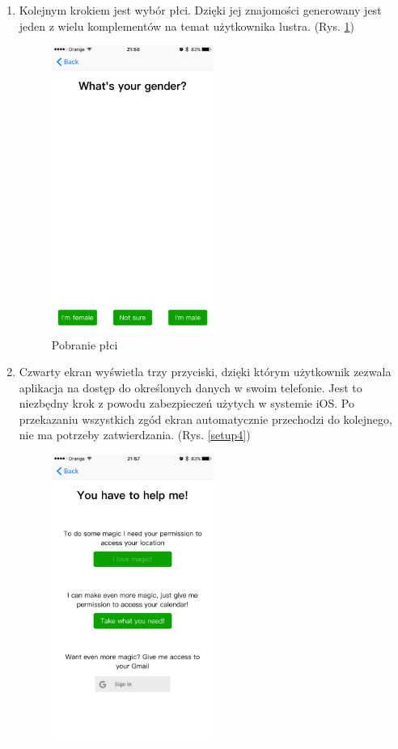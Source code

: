 \documentclass[a4paper,11pt]{article}
\begin{document}
\begin{enumerate}
	\newpage
	\item Kolejnym krokiem jest wybór płci. Dzięki jej znajomości generowany jest jeden z wielu komplementów na temat użytkownika lustra. (Rys. \ref{setup3})
	\begin{figure}[H]
	\includegraphics[width=0.5\textwidth,center]{ios-screens/setup3.png}
	\caption {Pobranie płci}
	\label{setup3}
	\end{figure}
\newpage
\item Czwarty ekran wyświetla trzy przyciski, dzięki którym użytkownik zezwala aplikacja na dostęp do określonych danych w swoim telefonie. Jest to niezbędny krok z powodu zabezpieczeń użytych w systemie iOS. Po przekazaniu wszystkich zgód ekran automatycznie przechodzi do kolejnego, nie ma potrzeby zatwierdzania. (Rys. \ref{setup4})
\begin{figure}[H]
	\includegraphics[width=0.5\textwidth,center]{ios-screens/setup4.png}

\end{figure}
\end{enumerate}
\end{document}
